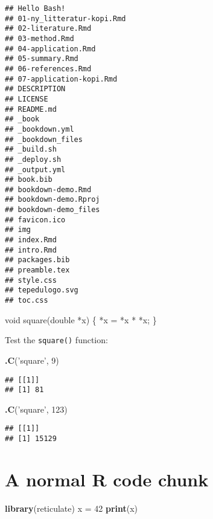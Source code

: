 \documentclass[]{book}
\newenvironment{Shaded}{\begin{snugshade}}{\end{snugshade}}
\newcommand{\DataTypeTok}[1]{\textcolor[rgb]{0.13,0.29,0.53}{#1}}
\newcommand{\DecValTok}[1]{\textcolor[rgb]{0.00,0.00,0.81}{#1}}
\newcommand{\KeywordTok}[1]{\textcolor[rgb]{0.13,0.29,0.53}{\textbf{#1}}}
\newcommand{\NormalTok}[1]{#1}
\newcommand{\StringTok}[1]{\textcolor[rgb]{0.31,0.60,0.02}{#1}}
\theoremstyle{definition}
\theoremstyle{definition}
\theoremstyle{definition}
\theoremstyle{remark}
\begin{document}
\begin{verbatim}
## Hello Bash!
## 01-ny_litteratur-kopi.Rmd
## 02-literature.Rmd
## 03-method.Rmd
## 04-application.Rmd
## 05-summary.Rmd
## 06-references.Rmd
## 07-application-kopi.Rmd
## DESCRIPTION
## LICENSE
## README.md
## _book
## _bookdown.yml
## _bookdown_files
## _build.sh
## _deploy.sh
## _output.yml
## book.bib
## bookdown-demo.Rmd
## bookdown-demo.Rproj
## bookdown-demo_files
## favicon.ico
## img
## index.Rmd
## intro.Rmd
## packages.bib
## preamble.tex
## style.css
## tepedulogo.svg
## toc.css
\end{verbatim}

\begin{Shaded}
\begin{Highlighting}[]
\DataTypeTok{void}\NormalTok{ square(}\DataTypeTok{double}\NormalTok{ *x) \{}
\NormalTok{  *x = *x * *x;}
\NormalTok{\}}
\end{Highlighting}
\end{Shaded}

Test the \texttt{square()} function:

\begin{Shaded}
\begin{Highlighting}[]
\KeywordTok{.C}\NormalTok{(}\StringTok{'square'}\NormalTok{, }\DecValTok{9}\NormalTok{)}
\end{Highlighting}
\end{Shaded}

\begin{verbatim}
## [[1]]
## [1] 81
\end{verbatim}

\begin{Shaded}
\begin{Highlighting}[]
\KeywordTok{.C}\NormalTok{(}\StringTok{'square'}\NormalTok{, }\DecValTok{123}\NormalTok{)}
\end{Highlighting}
\end{Shaded}

\begin{verbatim}
## [[1]]
## [1] 15129
\end{verbatim}

\hypertarget{a-normal-r-code-chunk}{%
\section{A normal R code chunk}\label{a-normal-r-code-chunk}}

\begin{Shaded}
\begin{Highlighting}[]
\KeywordTok{library}\NormalTok{(reticulate)}
\NormalTok{x =}\StringTok{ }\DecValTok{42}
\KeywordTok{print}\NormalTok{(x)}
\end{Highlighting}
\end{Shaded}
\end{document}
